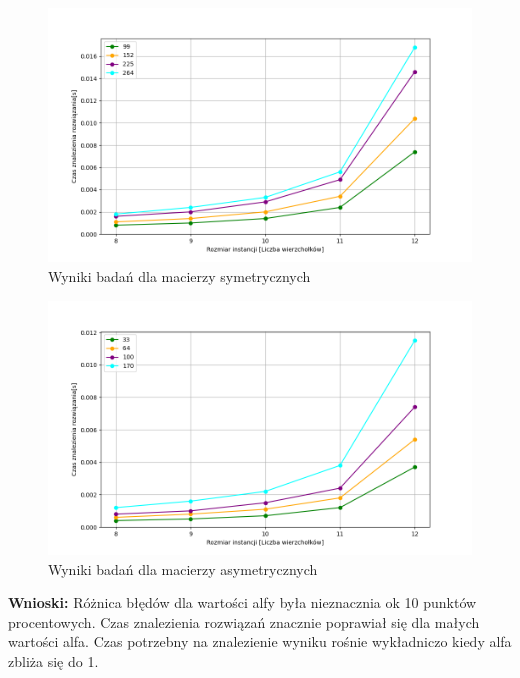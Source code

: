 \documentclass{article}
\begin{document}
        \FloatBarrier
        
        \FloatBarrier
        \begin{figure}[ht]
          \centering
          \includegraphics[width=\textwidth]{src/plots/symAnAlphaTime.png}
          \caption{Wyniki badań dla macierzy symetrycznych}
          \label{fig:symAlphaT}
        \end{figure}
        \begin{figure}[ht]
          \centering
          \includegraphics[width=\textwidth]{src/plots/asymAnAlphaTime.png}
          \caption{Wyniki badań dla macierzy asymetrycznych}
          \label{fig:asymAlphaT}
        \end{figure}
        \FloatBarrier 
        \textbf{Wnioski: } Różnica błędów dla wartości alfy była nieznacznia ok 10 punktów procentowych.
        Czas znalezienia rozwiązań znacznie poprawiał się dla małych wartości alfa. Czas potrzebny na
        znalezienie wyniku rośnie wykładniczo kiedy alfa zbliża się do 1.
\end{document}

